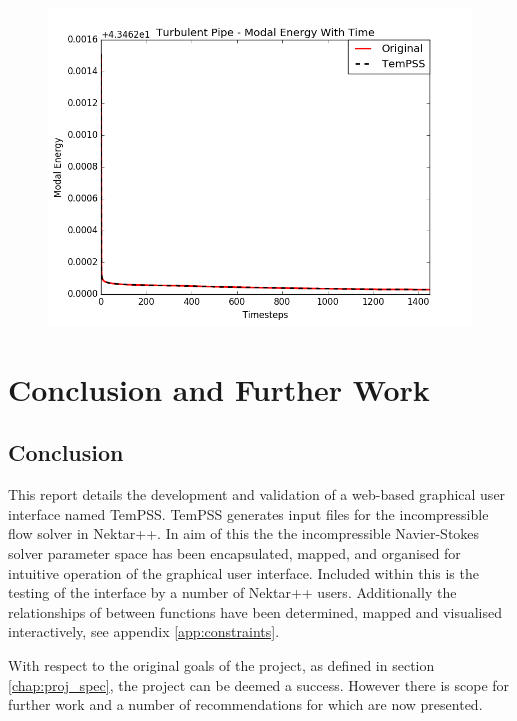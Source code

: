 \documentclass[11pt, a4paper]{report}
\begin{document}
\begin{figure}[htb!]
 \centering
 \includegraphics[width=.95\linewidth,  clip=true, trim = 0cm 0cm 0cm 0cm]{pipe_modal}
 \label{fig:pipe_modal}
\end{figure}

\chapter{Conclusion and Further Work}
\section{Conclusion}
This report details the development and validation of a web-based graphical user interface named TemPSS. TemPSS generates input files for the incompressible flow solver in Nektar++. In aim of this the the incompressible Navier-Stokes solver parameter space has been encapsulated, mapped, and organised for intuitive operation of the graphical user interface. Included within this is the testing of the interface by a number of Nektar++ users. Additionally the relationships of between functions have been determined, mapped and visualised interactively, see appendix \ref{app:constraints}.

With respect to the original goals of the project, as defined in section \ref{chap:proj_spec}, the project can be deemed a success. However there is scope for further work and a number of recommendations for which are now presented.
\end{document}
